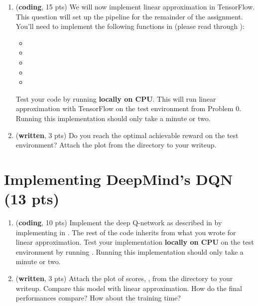 \documentclass{article}
\begin{document}
\begin{enumerate}
 \item (\textbf{coding}, 15 pts) We will now implement linear approximation in TensorFlow. This question will set up the pipeline for the remainder of the assignment. You'll need to implement the following functions in  (please read through ):
\begin{itemize}
	\item {}
	\item {}
	\item {}
	\item {}
	\item {}
\end{itemize}
Test your code by running  \textbf{locally on CPU}.  This will run linear approximation with TensorFlow on the test environment from Problem 0.  Running this implementation should only take a minute or two.

 \item (\textbf{written}, 3 pts) Do you reach the optimal achievable reward on the test environment? Attach the plot  from the directory  to your writeup.

\end{enumerate}


\section{Implementing DeepMind's DQN (13 pts)}

\begin{enumerate}

\item (\textbf{coding}, 10 pts) Implement the deep Q-network as described in \cite{mnih2015human} by implementing   in . The rest of the code inherits from what you wrote for linear approximation. Test your implementation \textbf{locally on CPU} on the test environment by running .  Running this implementation should only take a minute or two.

\item (\textbf{written}, 3 pts) Attach the plot of scores, , from the directory  to your writeup. Compare this model with linear approximation. How do the final performances compare? How about the training time?
\end{enumerate}
\end{document}

